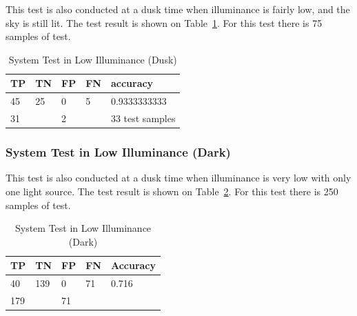 \par This test is also conducted at a dusk time when illuminance is fairly low, and the sky is still lit. The test result is shown on Table~\ref{tb:systest_lowillum_dusk}. For this test there is 75 samples of test.

\begin{table}
  \centering
  \caption{System Test in Low Illuminance (Dusk)}
  \label{tb:systest_lowillum_dusk}
  \begin{tabular}{|l|l|l|l|l|} 
  \hline
  TP & TN                    & FP & FN                & accuracy         \\ 
  \hline
  45 & 25                    & 0  & 5                 & 0.9333333333    \\ 
  \hline
  \multicolumn{2}{|l|}{31}   & \multicolumn{2}{l|}{2} & 33 test samples  \\
  \hline
  \end{tabular}
\end{table}

\subsubsection{System Test in Low Illuminance (Dark)}
\label{subsubsec:hedect_test_lowillum_dark}

\par This test is also conducted at a dusk time when illuminance is very low with only one light source. The test result is shown on Table~\ref{tb:systest_lowillum_dark}. For this test there is 250 samples of test.

\begin{table}
  \centering
  \caption{System Test in Low Illuminance (Dark)}
  \label{tb:systest_lowillum_dark}
  \begin{tabular}{|l|l|l|l|l|} 
    \hline
    TP & TN                     & FP & FN                 & Accuracy  \\ 
    \hline
    40 & 139                    & 0  & 71                 & 0.716     \\ 
    \hline
    \multicolumn{2}{|l|}{179}   & \multicolumn{2}{l|}{71} &           \\
    \hline
  \end{tabular}
\end{table}


